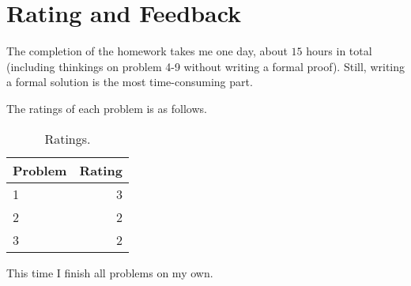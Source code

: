 \documentclass{article}
\begin{document}
\vspace{1em}
\section{Rating and Feedback}
\vspace{1em} \hspace{1.2em}
The completion of the homework takes me one day, about $15$ hours in total (including thinkings on problem 4-9 without writing a formal proof). Still, writing a formal solution is the most time-consuming part.

The ratings of each problem is as follows.

\begin{table}[htbp]
    \centering
    \begin{tabular}{lr}
        \hline
        Problem & Rating \\
        \hline 
        1 & 3 \\
        2 & 2 \\
        3 & 2 \\
        \hline
\end{tabular}
\caption{Ratings.}
\end{table}

This time I finish all problems on my own.
\end{document}
